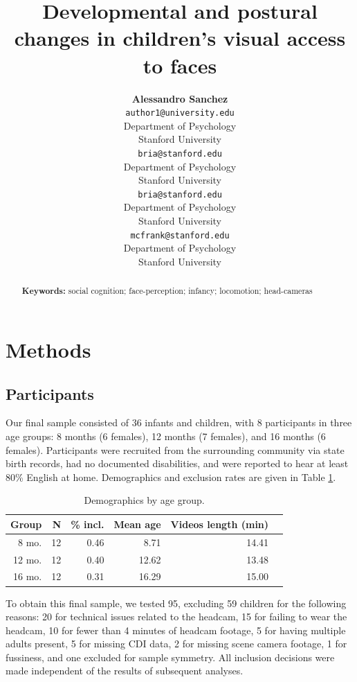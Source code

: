 \documentclass[10pt, letterpaper]{article}
\title{Developmental and postural changes in children's visual access to faces}
\author{{\large \bf Alessandro Sanchez} \\ \texttt{author1@university.edu} \\ Department of Psychology \\ Stanford University \And {\large \bf Bria Long} \\ \texttt{bria@stanford.edu} \\ Department of Psychology \\ Stanford University
    \And {\large \bf Ally Kraus} \\ \texttt{bria@stanford.edu} \\ Department of Psychology \\ Stanford University
    \And {\large \bf Michael C. Frank} \\ \texttt{mcfrank@stanford.edu} \\ Department of Psychology \\ Stanford University}
\begin{document}
\maketitle

\begin{abstract}


\textbf{Keywords:}
social cognition; face-perception; infancy; locomotion; head-cameras
\end{abstract}

\section{Methods}\label{methods}

\subsection{Participants}\label{participants}

Our final sample consisted of 36 infants and children, with 8
participants in three age groups: 8 months (6 females), 12 months (7
females), and 16 months (6 females). Participants were recruited from
the surrounding community via state birth records, had no documented
disabilities, and were reported to hear at least 80\% English at home.
Demographics and exclusion rates are given in Table \ref{tab:pop}.

\begin{table}[H]
\centering
\begin{tabular}{rrrrrr}
  \hline
 Group & N & \% incl. & Mean age & Videos length (min) \\ 
  \hline
   8 mo. &   12 & 0.46 & 8.71 & 14.41 \\ 
   12 mo. &  12 & 0.40 & 12.62 & 13.48 \\ 
   16 mo. &  12 & 0.31 & 16.29 & 15.00\\ 
   \hline
\end{tabular}
\caption{\label{tab:pop} Demographics by age group.}
\end{table}

To obtain this final sample, we tested 95, excluding 59 children for the
following reasons: 20 for technical issues related to the headcam, 15
for failing to wear the headcam, 10 for fewer than 4 minutes of headcam
footage, 5 for having multiple adults present, 5 for missing CDI data, 2
for missing scene camera footage, 1 for fussiness, and one excluded for
sample symmetry. All inclusion decisions were made independent of the
results of subsequent analyses.
\end{document}
